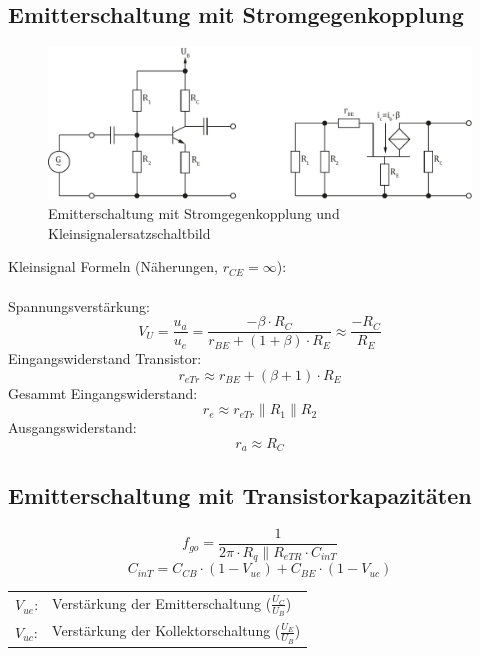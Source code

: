 \subsection{Emitterschaltung mit Stromgegenkopplung}
\begin{figure}[h!]
	\centering
	\includegraphics[width = \linewidth]{trans_emitter_stromgegen.pdf}
	\caption{Emitterschaltung mit Stromgegenkopplung und Kleinsignalersatzschaltbild}
	\label{trans:emitterschaltung_sgk}
\end{figure}
\noindent
Kleinsignal Formeln (Näherungen, $r_{CE} = \infty$):
\\\\
Spannungsverstärkung:
\[
	V_U = \frac{u_a}{u_e} = \frac{-\beta \cdot R_C}{r_{BE} + (1 + \beta) \cdot R_E} \approx \frac{-R_C}{R_E}
\]
Eingangswiderstand Transistor:
\[
	r_{eTr} \approx r_{BE} + (\beta + 1) \cdot R_E
\]
Gesammt Eingangswiderstand:
\[
	r_e \approx r_{eTr} \parallel R_1 \parallel R_2
\]
Ausgangswiderstand:
\[
	r_a \approx R_C
\]

\subsection{Emitterschaltung mit Transistorkapazitäten}
\[
	f_{go} = \frac{1}{2\pi \cdot R_q \parallel R_{eTR} \cdot C_{inT}}
\]
\[
	C_{inT} = C_{CB} \cdot (1-V_{ue}) + C_{BE} \cdot (1-V_{uc})
\]
\begin{tabular}{@{}ll}
  $V_{ue}$:	    & Verstärkung der Emitterschaltung ($\frac{U_{C}}{U_{B}}$) \\
  $V_{uc}$:	    & Verstärkung der Kollektorschaltung ($\frac{U_{E}}{U_{B}}$) \\
\end{tabular}

